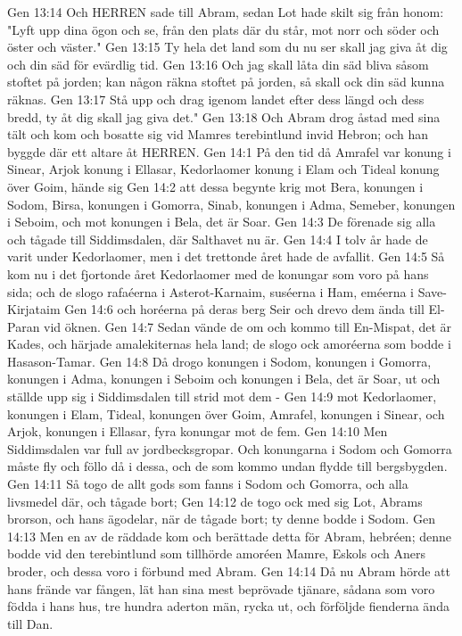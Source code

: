Gen 13:14  Och HERREN sade till Abram, sedan Lot hade skilt sig från honom: "Lyft upp dina ögon och se, från den plats där du står, mot norr och söder och öster och väster."
Gen 13:15  Ty hela det land som du nu ser skall jag giva åt dig och din säd för evärdlig tid.
Gen 13:16  Och jag skall låta din säd bliva såsom stoftet på jorden; kan någon räkna stoftet på jorden, så skall ock din säd kunna räknas.
Gen 13:17  Stå upp och drag igenom landet efter dess längd och dess bredd, ty åt dig skall jag giva det."
Gen 13:18  Och Abram drog åstad med sina tält och kom och bosatte sig vid Mamres terebintlund invid Hebron; och han byggde där ett altare åt HERREN.
Gen 14:1  På den tid då Amrafel var konung i Sinear, Arjok konung i Ellasar, Kedorlaomer konung i Elam och Tideal konung över Goim, hände sig
Gen 14:2  att dessa begynte krig mot Bera, konungen i Sodom, Birsa, konungen i Gomorra, Sinab, konungen i Adma, Semeber, konungen i Seboim, och mot konungen i Bela, det är Soar.
Gen 14:3  De förenade sig alla och tågade till Siddimsdalen, där Salthavet nu är.
Gen 14:4  I tolv år hade de varit under Kedorlaomer, men i det trettonde året hade de avfallit.
Gen 14:5  Så kom nu i det fjortonde året Kedorlaomer med de konungar som voro på hans sida; och de slogo rafaéerna i Asterot-Karnaim, suséerna i Ham, eméerna i Save-Kirjataim
Gen 14:6  och horéerna på deras berg Seir och drevo dem ända till El-Paran vid öknen.
Gen 14:7  Sedan vände de om och kommo till En-Mispat, det är Kades, och härjade amalekiternas hela land; de slogo ock amoréerna som bodde i Hasason-Tamar.
Gen 14:8  Då drogo konungen i Sodom, konungen i Gomorra, konungen i Adma, konungen i Seboim och konungen i Bela, det är Soar, ut och ställde upp sig i Siddimsdalen till strid mot dem -
Gen 14:9  mot Kedorlaomer, konungen i Elam, Tideal, konungen över Goim, Amrafel, konungen i Sinear, och Arjok, konungen i Ellasar, fyra konungar mot de fem.
Gen 14:10  Men Siddimsdalen var full av jordbecksgropar. Och konungarna i Sodom och Gomorra måste fly och föllo då i dessa, och de som kommo undan flydde till bergsbygden.
Gen 14:11  Så togo de allt gods som fanns i Sodom och Gomorra, och alla livsmedel där, och tågade bort;
Gen 14:12  de togo ock med sig Lot, Abrams brorson, och hans ägodelar, när de tågade bort; ty denne bodde i Sodom.
Gen 14:13  Men en av de räddade kom och berättade detta för Abram, hebréen; denne bodde vid den terebintlund som tillhörde amoréen Mamre, Eskols och Aners broder, och dessa voro i förbund med Abram.
Gen 14:14  Då nu Abram hörde att hans frände var fången, lät han sina mest beprövade tjänare, sådana som voro födda i hans hus, tre hundra aderton män, rycka ut, och förföljde fienderna ända till Dan.
